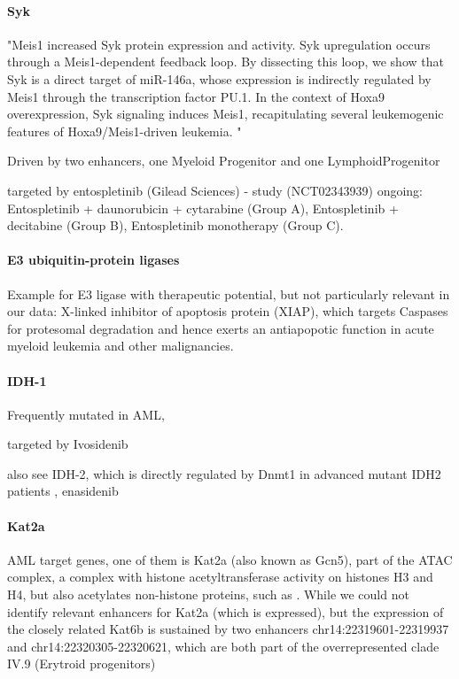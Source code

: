 \paragraph{Syk}
"Meis1 increased Syk protein expression and activity. Syk upregulation occurs through a Meis1-dependent feedback loop. By dissecting this loop, we show that Syk is a direct target of miR-146a, whose expression is indirectly regulated by Meis1 through the transcription factor PU.1. In the context of Hoxa9 overexpression, Syk signaling induces Meis1, recapitulating several leukemogenic features of Hoxa9/Meis1-driven leukemia. \cite{Mohr2017}"

Driven by two enhancers, one Myeloid Progenitor and one LymphoidProgenitor \cite{Mohr2017}

targeted by entospletinib (Gilead Sciences) - study (NCT02343939) ongoing: Entospletinib + daunorubicin + cytarabine (Group A), Entospletinib + decitabine (Group B), Entospletinib monotherapy (Group C).


\paragraph{E3 ubiquitin-protein ligases}
Example for E3 ligase with therapeutic potential, but not particularly relevant in our data: X-linked inhibitor of apoptosis protein (XIAP), which targets Caspases for protesomal degradation and hence exerts an antiapopotic function in acute myeloid leukemia\cite{Carter2003,Carter2005} and other malignancies. 

\paragraph{IDH-1}
Frequently mutated in AML, 

targeted by Ivosidenib 

also see IDH-2, which is directly regulated by Dnmt1
in advanced mutant IDH2 patients , enasidenib\cite{Stone2017}
\paragraph{Kat2a}
AML target genes, one of them is Kat2a (also known as Gcn5)\cite{Tzelepis2016}, part of the ATAC complex, a complex with histone acetyltransferase activity on histones H3 and H4, but also acetylates non-histone proteins, such as \tfcebpb\cite{Wiper-Bergeron2007}. While we could not identify relevant enhancers for Kat2a (which is expressed), but the expression of the closely related Kat6b is sustained by two enhancers chr14:22319601-22319937 and chr14:22320305-22320621, which are both part of the overrepresented clade IV.9 (Erytroid progenitors) 

